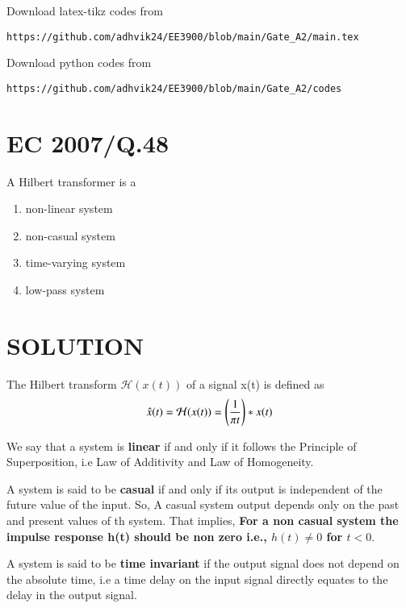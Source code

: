 \documentclass[journal,12pt,twocolumn]{IEEEtran}
\begin{document}
Download latex-tikz codes from 
%
\begin{lstlisting}
https://github.com/adhvik24/EE3900/blob/main/Gate_A2/main.tex
\end{lstlisting}
%
Download python codes from 
%
\begin{lstlisting}
https://github.com/adhvik24/EE3900/blob/main/Gate_A2/codes
\end{lstlisting}
\section{EC 2007/Q.48}
A Hilbert transformer is a
\begin{enumerate}
    \item non-linear system
    \item non-casual system
    \item time-varying system
    \item low-pass system
\end{enumerate}
\section{SOLUTION}
\begin{definition}
The Hilbert transform $\mathcal{H}(x(t))$ of a signal x(t) is defined as
\begin{align}
    \hat{x}(t)=\mathcal{H}(x(t))= \left(\frac{1}{\pi t}\right)\ast x(t)
\end{align}
\end{definition}
\begin{definition}
We say that a system is\textbf{ linear} if and only if it follows the Principle of Superposition, i.e Law of Additivity and Law of Homogeneity.
\label{L}
\end{definition}

\begin{definition}
A system is said to be \textbf{casual} if and only if its output is independent of the future value of the input. So, A casual system output depends only on the past and present values of th system.
That implies, \textbf{For a non casual system the impulse response h(t) should be non zero i.e., $h(t)\ne0$ for $t<0$}. \label{def}
\end{definition}

\begin{definition}
A system is said to be \textbf{time invariant} if the output signal does not depend on the absolute time, i.e a time delay on the input signal directly equates to the delay in the output signal.
\label{T}
\end{definition}
\end{document}
